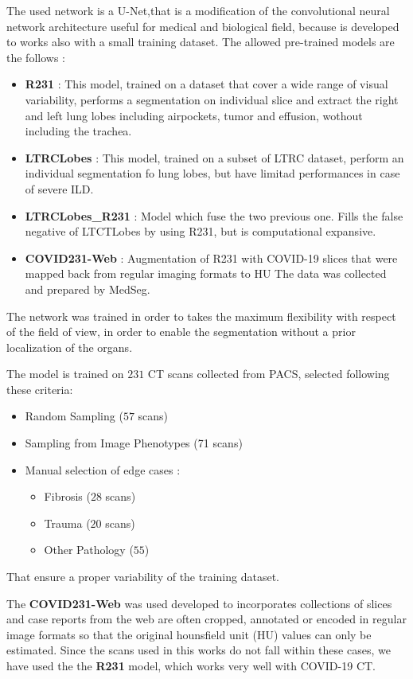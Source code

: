 \documentclass{standalone}
\begin{document}
	The used network is a U-Net,that is a modification of the convolutional neural network architecture useful for medical and biological field, because is developed to works also with a small training dataset.
	The allowed pre-trained models are the follows : 
	\begin{itemize}
		\item \textbf{R231} : This model, trained on a dataset that cover a wide range of visual variability, performs a segmentation on individual slice and extract the right and left lung lobes including airpockets, tumor and effusion, wothout including the trachea.
		
		\item \textbf{LTRCLobes} : This model, trained on a subset of LTRC dataset, perform an individual segmentation fo lung lobes, but have limitad performances in case of severe ILD.
		
		\item \textbf{LTRCLobes\_R231} : Model which fuse the two previous one. Fills the false negative of LTCTLobes by using R231, but is computational expansive.
		
		\item \textbf{COVID231-Web} : Augmentation of R231 with COVID-19 slices that were mapped back from regular imaging formats to HU The data was collected and prepared by MedSeg. 
	\end{itemize}
		
	
	The network was trained in order to takes the maximum flexibility with respect of the field of view, in order to enable the segmentation without a prior localization of the organs.
	
	The model is trained on $231$ CT scans collected from PACS, selected following these criteria: 
	\begin{itemize}
		\item Random Sampling ($57$ scans)
		
		\item Sampling from Image Phenotypes (71 scans)
		
		\item Manual selection of edge cases : 
			\begin{itemize}
				\item Fibrosis ($28$ scans)
				
				\item Trauma ($20$ scans)
				
				\item Other Pathology ($55$)
				
			\end{itemize}
	\end{itemize}

	That ensure a proper variability of the training dataset.
	
	 The \textbf{COVID231-Web} was used developed to incorporates collections of slices and case reports from the web are often cropped, annotated or encoded in regular image formats so that the original hounsfield unit (HU) values can only be estimated.  Since the scans used in this works do not fall within these cases, we have used the the \textbf{R231} model, which works very well with COVID-19 CT.
	
	 
\end{document}
